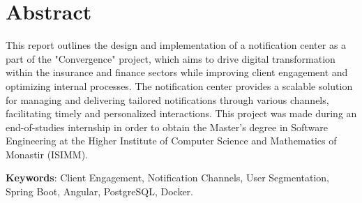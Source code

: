 \chapter*{Abstract}

This report outlines the design and implementation of a notification center
as a part of the "Convergence" project, which aims to drive digital transformation 
within the insurance and finance sectors while improving client engagement and 
optimizing internal processes. The notification center provides a scalable solution 
for managing and delivering tailored notifications through various channels, 
facilitating timely and personalized interactions. This project was made during an
end-of-studies internship in order to obtain the Master's degree in Software Engineering 
at the Higher Institute of Computer Science and Mathematics of Monastir (ISIMM).

\vspace{2cm}
\textbf{Keywords}: Client Engagement, Notification Channels, User Segmentation,
Spring Boot, Angular, PostgreSQL, Docker.